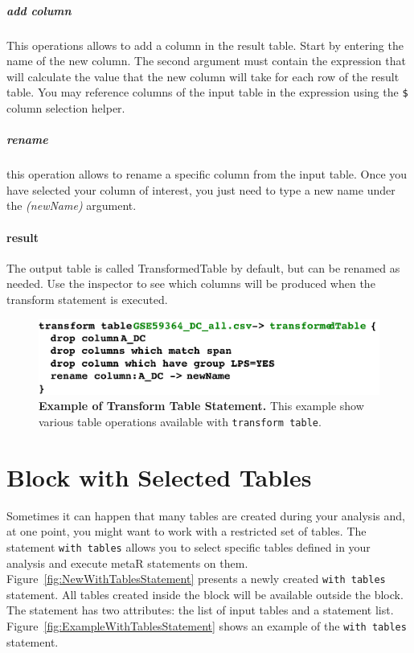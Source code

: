 \subparagraph{add column}
This operations allows to add a column in the result table. Start by entering the name of the new column. The second argument must contain the expression that will calculate the value that the new column will take for each row of the result table. You may reference columns of the input table in the expression using the \texttt{\$} column selection helper.  

\subparagraph{rename} this operation allows to rename a specific column from the input table. Once you have selected your column of interest, you just need to type a new name under the \textit{(newName)} argument.

\paragraph{result}
The output table is called TransformedTable by default, but can be renamed as needed. Use the inspector to see which columns will be produced when the transform statement is executed.


\begin{figure}
  \centering
  \includegraphics[width=\figWidthNarrow]{figures/TransformTable.pdf}
\caption[Example of Transform Table Statement.]{\textbf{Example of Transform Table Statement.} This example show various table operations available with \texttt{transform table}.}
\label{fig:TransformTable}
\end{figure}

\section{Block with Selected Tables}
Sometimes it can happen that many tables are created during your analysis and, at one point, you might want to work with a restricted set of tables.
The statement \texttt{with tables} allows you to select specific tables defined in your analysis and execute metaR statements on them.
Figure~\ref{fig:NewWithTablesStatement} presents a newly created \texttt{with tables} statement. All tables created inside the block will be available outside the block.
The statement has two attributes: the list of input tables and a statement list. Figure~\ref{fig:ExampleWithTablesStatement} shows an example of the \texttt{with tables} statement.

